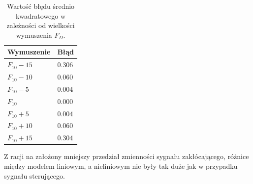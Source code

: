 \begin{table}[h!]
\centering
\renewcommand{\arraystretch}{1.2} %
\begin{tabular}{|>{\centering\arraybackslash}m{3cm}|>{\centering\arraybackslash}m{3cm}|}
\hline
Wymuszenie & Błąd \\ \hline
$F_{10} - 15$ & $\num{0.306}$ \\ \hline
$F_{10} - 10$ & $\num{0.060}$ \\ \hline
$F_{10} - 5$ & $\num{0.004}$ \\ \hline
$F_{10}$ & $\num{0.000}$ \\ \hline
$F_{10} + 5$ & $\num{0.004}$ \\ \hline
$F_{10} + 10$ & $\num{0.060}$ \\ \hline
$F_{10} + 15$ & $\num{0.304}$ \\ \hline
\end{tabular}
\caption{Wartość błędu średnio kwadratowego w zależności od wielkości wymuszenia $F_D$.}
\end{table}

Z racji na założony mniejszy przedział zmienności sygnału zakłócającego, różnice między modelem liniowym, a nieliniowym nie były tak duże jak w przypadku sygnału sterującego.